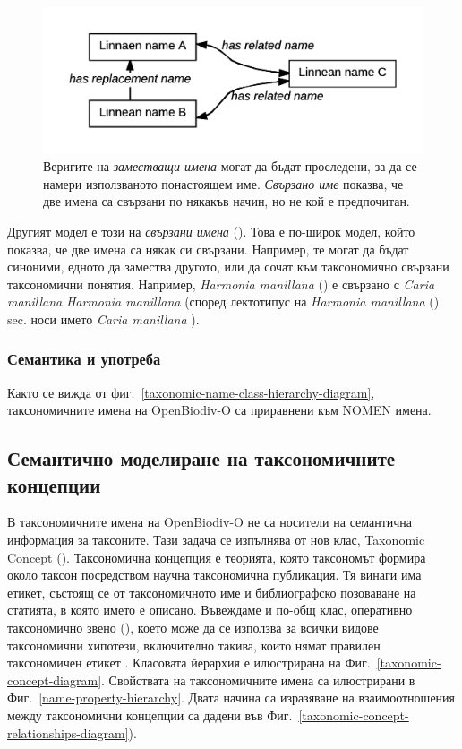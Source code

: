 \begin{figure}[h!]
 \centering
  \includegraphics[width=\textwidth]{Figures/scientific-name-patterns}
  \decoRule
  \caption[Scientific name patterns diagram.]{
  Веригите на \emph {заместващи имена} могат да бъдат проследени, за да се намери използваното понастоящем име. \emph{Свързано име} показва, че две имена са свързани по някакъв начин, но не кой е предпочитан.}
  \label{scientific-name-patterns}
\end{figure}

Другият модел е този на \emph{свързани имена} (). Това е по-широк модел, който показва, че две имена са някак си свързани. Например, те могат да бъдат синоними, едното да замества другото, или да сочат към таксономично свързани таксономични понятия. Например, \emph{Harmonia manillana} (\cite{mulsant_monographie_1866}) е свързано с \emph{Caria manillana} \cite {mulsant_monographie_1866} \emph{Harmonia manillana} (според \cite{poorani_harmonia_2016} лектотипус на \emph{Harmonia manillana} (\cite{mulsant_monographie_1866}) sec. \cite{poorani_harmonia_2016} носи името \emph{Caria manillana} \cite{mulsant_monographie_1866}).

\subsubsection{Семантика и употреба}

Както се вижда от фиг.~\ref{taxonomic-name-class-hierarchy-diagram}, таксономичните имена на OpenBiodiv-O са приравнени към NOMEN имена. 


\subsection{Семантично моделиране на таксономичните концепции}

В таксономичните имена на OpenBiodiv-O не са носители на семантична информация за таксоните. Тази задача се изпълнява от нов клас, Taxonomic Concept (). Таксономична концепция е теорията, която таксономът формира около таксон посредством научна таксономична публикация. Тя винаги има етикет, състоящ се от таксономичното име и библиографско позоваване на статията, в която името е описано. Въвеждаме и по-общ клас, оперативно таксономично звено (), което може да се използва за всички видове таксономични хипотези, включително такива, които нямат правилен таксономичен етикет . Класовата йерархия е илюстрирана на Фиг.~\ref{taxonomic-concept-diagram}. Свойствата на таксономичните имена са илюстрирани в Фиг.~\ref{name-property-hierarchy}.  Двата начина са изразяване на взаимоотношения между таксономични концепции са дадени във Фиг.~\ref{taxonomic-concept-relationships-diagram}).

